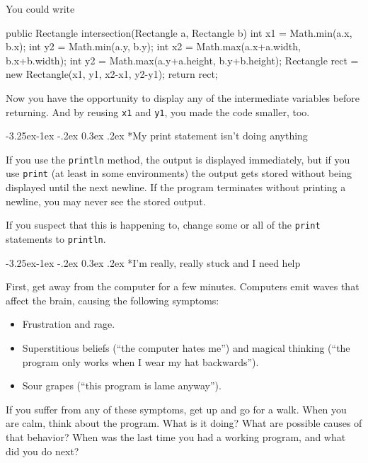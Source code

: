\documentclass[12pt]{book}
\makeatletter
\theoremstyle{exercise}
\renewcommand\subsection{\@startsection{subsection}{2}{\z@}%
    {-3.25ex\@plus -1ex \@minus -.2ex}%
    {0.3ex \@plus .2ex}%
    {\normalfont\large\bfseries}}
\makeatother
\begin{document}
You could write

\begin{code}
public Rectangle intersection(Rectangle a, Rectangle b) {
    int x1 = Math.min(a.x, b.x);
    int y2 = Math.min(a.y, b.y);
    int x2 = Math.max(a.x+a.width, b.x+b.width);
    int y2 = Math.max(a.y+a.height, b.y+b.height);
    Rectangle rect = new Rectangle(x1, y1, x2-x1, y2-y1);
    return rect;
}
\end{code}

Now you have the opportunity to display any of the intermediate variables before returning.
And by reusing {\tt x1} and {\tt y1}, you made the code smaller, too.


\subsection*{My print statement isn't doing anything}

If you use the {\tt println} method, the output is displayed immediately, but if you use {\tt print} (at least in some environments) the output gets stored without being displayed until the next newline.
If the program terminates without printing a newline, you may never see the stored output.

If you suspect that this is happening to, change some or all of the {\tt print} statements to {\tt println}.


\subsection*{I'm really, really stuck and I need help}

First, get away from the computer for a few minutes.
Computers emit waves that affect the brain, causing the following
symptoms:

\begin{itemize}

\item Frustration and rage.

\item Superstitious beliefs (``the computer hates me'') and
magical thinking (``the program only works when I wear my
hat backwards'').

\item Sour grapes (``this program is lame anyway'').

\end{itemize}

If you suffer from any of these symptoms, get up and go for a walk.  When you are calm, think about the program.
What is it doing?
What are possible causes of that behavior?
When was the last time you had a working program, and what did you do next?
\end{document}
